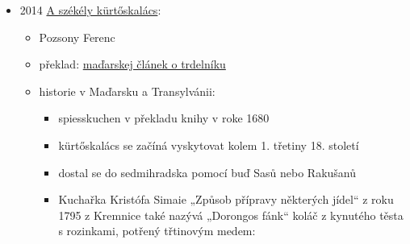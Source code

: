 \begin{itemize}
  \begin{itemize}
  \tightlist
  \item
    s. 240-241
  \item
    řeší, že trdelníky, dřív pečený z přesného těsta k masopustu dnes
    nabízí stánkaři
  \item
    není to nic nového, dělo se to vžycky, třeba s perníkem
  \end{itemize}
\item
  2014
  \href{https://epa.oszk.hu/03300/03308/00007/pdf/EPA03308_acta_siculica_2014-2015_497_518.pdf}{A
  székély kürtőskalács}:

  \begin{itemize}
  \tightlist
  \item
    Pozsony Ferenc
  \item
    překlad: \hyperref[250319-1326]{maďarskej článek o trdelníku}
  \item
    historie v Maďarsku a Transylvánii:

    \begin{itemize}
    \tightlist
    \item
      spiesskuchen v překladu knihy v roke 1680
    \item
      kürtőskalács se začíná vyskytovat kolem 1. třetiny 18. století
    \item
      dostal se do sedmihradska pomocí buď Sasů nebo Rakušanů
    \item
      Kuchařka Kristófa Simaie „Způsob přípravy některých jídel`` z roku
      1795 z Kremnice také nazývá „Dorongos fánk`` koláč z kynutého
      těsta s rozinkami, potřený třtinovým medem:


\end{itemize}
\end{itemize}
\end{itemize}
